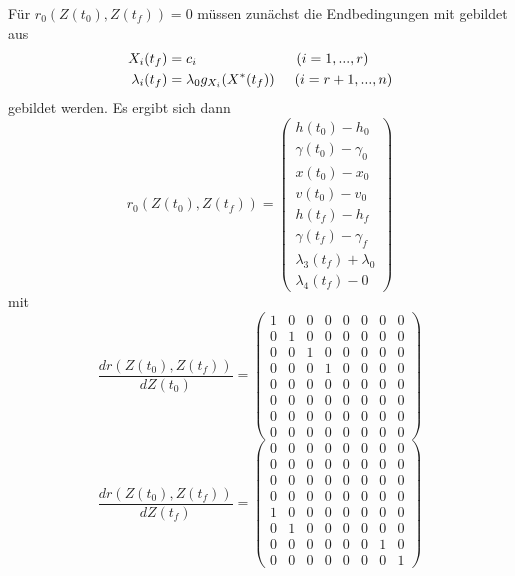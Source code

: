 Für $r_0(Z(t_0),Z(t_f)) = 0$ müssen zunächst die Endbedingungen mit gebildet aus 
\[\begin{split}
X_i(t_f) &= c_i \hspace{25mm} (i=1,...,r) \\\
\lambda_i(t_f) &= \lambda_0 g_{X_i}(X^{\ast}(t_f)) \hspace{5mm} (i=r+1,...,n)
\end{split}\] gebildet werden. Es ergibt sich dann
\[r_0(Z(t_0),Z(t_f)) = \begin{pmatrix}
h(t_0) - h_0 \\ 
\gamma(t_0) - \gamma_0 \\
x(t_0) - x_0 \\ 
v(t_0) - v_0 \\ 
h(t_f) - h_f \\ 
\gamma(t_f) - \gamma_f \\
\lambda_3(t_f) + \lambda_0 \\ 
\lambda_4(t_f) - 0
\end{pmatrix}\]
mit 
\[\dfrac{d r(Z(t_0),Z(t_f))}{d Z(t_0)} = \begin{pmatrix}
1 & 0 & 0 & 0 & 0 & 0 & 0 & 0 \\ 
0 & 1 & 0 & 0 & 0 & 0 & 0 & 0 \\ 
0 & 0 & 1 & 0 & 0 & 0 & 0 & 0 \\ 
0 & 0 & 0 & 1 & 0 & 0 & 0 & 0 \\
0 & 0 & 0 & 0 & 0 & 0 & 0 & 0 \\
0 & 0 & 0 & 0 & 0 & 0 & 0 & 0 \\
0 & 0 & 0 & 0 & 0 & 0 & 0 & 0 \\
0 & 0 & 0 & 0 & 0 & 0 & 0 & 0
\end{pmatrix}\]
\[\dfrac{d r(Z(t_0),Z(t_f))}{d Z(t_f)} = \begin{pmatrix}
0 & 0 & 0 & 0 & 0 & 0 & 0 & 0 \\ 
0 & 0 & 0 & 0 & 0 & 0 & 0 & 0 \\ 
0 & 0 & 0 & 0 & 0 & 0 & 0 & 0 \\ 
0 & 0 & 0 & 0 & 0 & 0 & 0 & 0 \\
1 & 0 & 0 & 0 & 0 & 0 & 0 & 0 \\
0 & 1 & 0 & 0 & 0 & 0 & 0 & 0 \\
0 & 0 & 0 & 0 & 0 & 0 & 1 & 0 \\
0 & 0 & 0 & 0 & 0 & 0 & 0 & 1
\end{pmatrix}\]






















